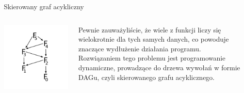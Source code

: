 \begin{frame}{Skierowany graf acykliczny}
    \centering
    \begin{columns}
        \begin{column}{0.5\textwidth}
            \includegraphics[width=1.2\textwidth,height=0.7\textheight]{recursion/graphics/fibonacci_dag.png}
        \end{column}
        \begin{column}{0.5\textwidth}
            Pewnie zauważyliście, że wiele z funkcji liczy się wielokrotnie dla tych samych danych, co powoduje znaczące wydłużenie działania programu. \\
            Rozwiązaniem tego problemu jest programowanie dynamiczne, prowadzące do drzewa wywołań w formie DAGu, czyli skierowanego grafu acyklicznego.
        \end{column}
    \end{columns}
\end{frame}
